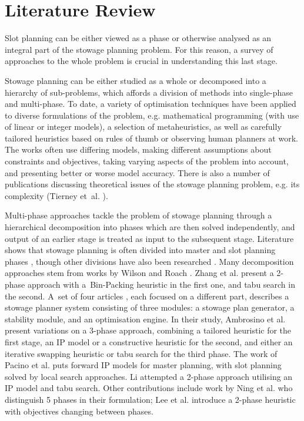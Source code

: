 \documentclass[preprint,12pt,3p]{elsarticle}
\begin{document}
\section{Literature Review}
\label{sec:Literature}
Slot planning can be either viewed as a phase or otherwise analysed as an integral part of the stowage planning problem. For this reason, a survey of approaches to the whole problem is crucial in understanding this last stage. 

Stowage planning can be either studied as a whole or decomposed into a hierarchy of sub-problems, which affords a division of methods into single-phase and multi-phase. To date, a variety of optimisation techniques have been applied to diverse formulations of the problem, e.g. mathematical programming (with use of linear or integer models), a selection of metaheuristics, as well as carefully tailored heuristics based on rules of thumb or observing human planners at work. The works often use differing models, making different assumptions about constraints and objectives, taking varying aspects of the problem into account, and presenting better or worse model accuracy. There is also a number of publications discussing theoretical issues of the stowage planning problem, e.g. its complexity (Tierney et~al. \cite{TPJ14}).

Multi-phase approaches tackle the problem of stowage planning through a hierarchical decomposition into phases which are then solved independently, and output of an earlier stage is treated as input to the subsequent stage. Literature shows that stowage planning is often divided into master and slot planning phases \cite{DPhD, PDJB11}, though other divisions have also been researched \cite{N13}. Many decomposition approaches stem from works by Wilson and Roach \cite{WR00}. Zhang et al. \cite{ZLJ05} present a 2-phase approach with a~Bin-Packing heuristic in the first one, and tabu search in the second. A~set of four articles \cite{LXFHH09, MLJYFA10A, MLJYFA10B, XLFYJZ09}, each focused on a different part, describes a stowage planner system consisting of three modules: a stowage plan generator, a stability module, and an optimisation engine. In their study, Ambrosino et al. \cite{AAPS09, AAPS10, APS15} present variations on a 3-phase approach, combining a tailored heuristic for the first stage, an IP model or a constructive heuristic for the second, and either an iterative swapping heuristic or tabu search for the third phase. The work of Pacino et al. \cite{PDJB11} puts forward IP models for master planning, with slot planning solved by local search approaches. Li \cite{L12} attempted a 2-phase approach utilising an IP model and tabu search. Other contributions include work by Ning et al. \cite{N13} who distinguish 5 phases in their formulation; Lee et al. \cite{LFH15} introduce a 2-phase heuristic with objectives changing between phases.
\end{document}

